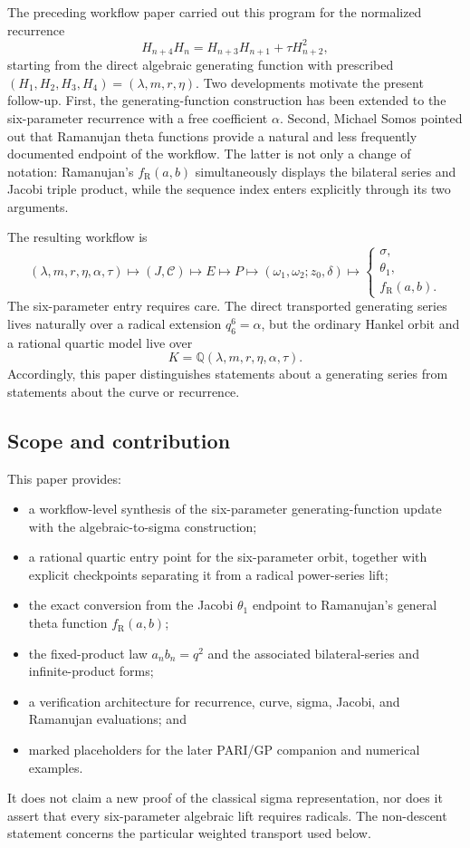 \documentclass[11pt]{article}
\newcommand{\taupar}{\tau}
\newcommand{\RamF}{f_{\mathrm R}}
\begin{document}
The preceding workflow paper carried out this program for the normalized
recurrence
\[
 H_{n+4}H_n=H_{n+3}H_{n+1}+\taupar H_{n+2}^2,
\]
starting from the direct algebraic generating function with prescribed
$(H_1,H_2,H_3,H_4)=(\lambda,m,r,\eta)$.  Two developments motivate the present
follow-up.  First, the generating-function construction has been extended to
the six-parameter recurrence with a free coefficient $\alpha$.  Second,
Michael Somos pointed out that Ramanujan theta functions provide a natural and
less frequently documented endpoint of the workflow.  The latter is not only
a change of notation: Ramanujan's $\RamF(a,b)$ simultaneously displays the
bilateral series and Jacobi triple product, while the sequence index enters
explicitly through its two arguments.

The resulting workflow is
\[
(\lambda,m,r,\eta,\alpha,\taupar)
\longmapsto (J,\mathcal C)
\longmapsto E
\longmapsto P
\longmapsto(\omega_1,\omega_2;z_0,\delta)
\longmapsto
\begin{cases}
 \sigma,\\
 \theta_1,\\
 \RamF(a,b).
\end{cases}
\]
The six-parameter entry requires care.  The direct transported generating
series lives naturally over a radical extension $q_6^6=\alpha$, but the
ordinary Hankel orbit and a rational quartic model live over
\[
 K=\mathbb Q(\lambda,m,r,\eta,\alpha,\taupar).
\]
Accordingly, this paper distinguishes statements about a generating series
from statements about the curve or recurrence.

\subsection{Scope and contribution}
This paper provides:
\begin{itemize}[leftmargin=2em]
 \item a workflow-level synthesis of the six-parameter generating-function
       update with the algebraic-to-sigma construction;
 \item a rational quartic entry point for the six-parameter orbit, together
       with explicit checkpoints separating it from a radical power-series
       lift;
 \item the exact conversion from the Jacobi $\theta_1$ endpoint to
       Ramanujan's general theta function $\RamF(a,b)$;
 \item the fixed-product law $a_nb_n=q^2$ and the associated bilateral-series
       and infinite-product forms;
 \item a verification architecture for recurrence, curve, sigma, Jacobi, and
       Ramanujan evaluations; and
 \item marked placeholders for the later PARI/GP companion and numerical
       examples.
\end{itemize}
It does not claim a new proof of the classical sigma representation, nor does
it assert that every six-parameter algebraic lift requires radicals.  The
non-descent statement concerns the particular weighted transport used below.
\end{document}
